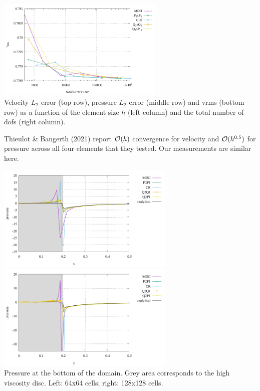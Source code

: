 \begin{center}
\includegraphics[width=8cm]{python_codes/fieldstone_112/results/exp5/vrms_ndof.pdf}\\
{\captionfont Velocity $L_2$ error (top row), pressure $L_2$ error (middle row) and vrms (bottom row) 
as a function of the element size $h$ (left column) and the total number of dofs (right column).}
\end{center}

Thieulot \& Bangerth (2021) \cite{thba21} report ${\cal O}(h)$ convergence for 
velocity and ${\cal O}(h^{0.5})$ for pressure across all four elements that they tested.
Our measurements are similar here.


\begin{center}
\includegraphics[width=8.5cm]{python_codes/fieldstone_112/results/exp5/bottom64}
\includegraphics[width=8.5cm]{python_codes/fieldstone_112/results/exp5/bottom128}\\
{\captionfont Pressure at the bottom of the domain. Grey area corresponds to the 
high viscosity disc. Left: 64x64 cells; right: 128x128 cells.}
\end{center}


